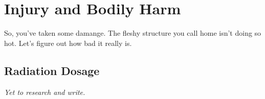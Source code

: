 \hypertarget{harm}{}
\section{Injury and Bodily Harm}

So, you've taken some damange. The fleshy structure you call home isn't doing so hot. Let's figure out how bad it really is.

\hypertarget{harm_radiation}{}
\subsection{Radiation Dosage}

\textit{Yet to research and write.}